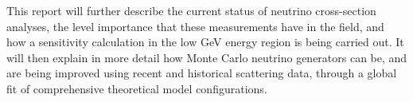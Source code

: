 This report will further describe the current status of neutrino cross-section analyses, the level importance that these measurements have in the field, and how a sensitivity calculation in the low GeV energy region is being carried out. It will then explain in more detail how Monte Carlo neutrino generators can be, and are being improved using recent and historical scattering data, through a global fit of comprehensive theoretical model configurations.  

\clearpage
